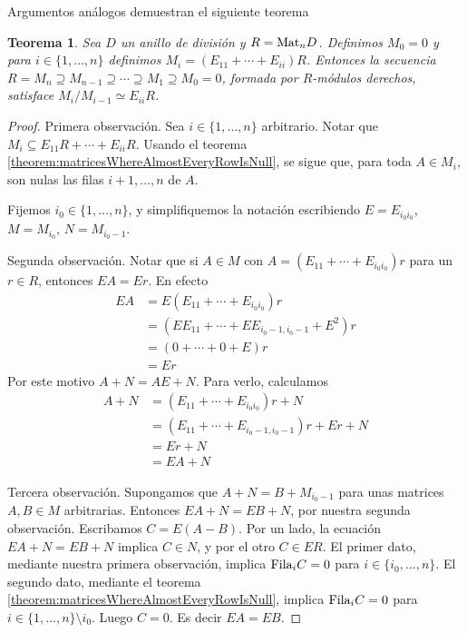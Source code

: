\documentclass{report}
\newcommand{\Mat}{\textnormal{Mat}}
\newcommand{\Fila}{\textnormal{Fila}}
\newtheorem{theorem}{Teorema}
\begin{document}
  Argumentos análogos demuestran el siguiente teorema
  \begin{theorem}\label{theorem:compositionSeriesOfRightModulesForMatrixRing}
    Sea \(D\) un anillo de división y \(R = \Mat_n D\).
    Definimos \(M_0 = 0\) y para \(i \in \{1, \dots, n\}\) definimos \(M_i = (E_{1 1} + \cdots + E_{i i}) R\).
    Entonces la secuencia \(R = M_n \supseteq M_{n - 1} \supseteq \cdots \supseteq M_1 \supseteq M_0 = 0\), formada por \(R\)-módulos derechos, satisface \(M_i / M_{i - 1} \simeq E_{i i} R\).
  \end{theorem}
  \begin{proof}
    Primera observación.
    Sea \(i \in \{1, \dots, n\}\) arbitrario.
    Notar que \(M_i \subseteq E_{1 1} R + \cdots + E_{i i} R\).
    Usando el teorema \ref{theorem:matricesWhereAlmostEveryRowIsNull}, se sigue que, para toda \(A \in M_i\), son nulas las filas \(i + 1, \dots, n\) de \(A\).

    Fijemos \(i_0 \in \{1, \dots, n\}\), y simplifiquemos la notación escribiendo \(E = E_{i_0 i_0}\), \(M = M_{i_0}\), \(N = M_{i_0 - 1}\).

    Segunda observación.
    Notar que si \(A \in M\) con \(A = (E_{1 1} + \cdots + E_{i_0 i_0}) r\) para un \(r \in R\), entonces \(E A = E r\).
    En efecto
    \begin{align}
      E A
      &=
      E (E_{1 1} + \cdots + E_{i_0 i_0}) r
      \\
      &=
      (E E_{1 1} + \cdots + E E_{i_0 - 1, i_0 - 1} + E^2) r
      \\
      &=
      (0 + \cdots + 0 + E) r
      \\
      &=
      E r
    \end{align}
    Por este motivo \(A + N = A E + N\).
    Para verlo, calculamos
    \begin{align}
      A + N
      &=
      (E_{1 1} + \cdots + E_{i_0 i_0}) r + N
      \\
      &=
      (E_{1 1} + \cdots + E_{i_0 - 1, i_0 - 1}) r + E r + N
      \\
      &=
      E r + N
      \\
      &=
      E A + N
    \end{align}

    Tercera observación.
    Supongamos que \(A + N = B + M_{i_0 -1}\) para unas matrices \(A, B \in M\) arbitrarias.
    Entonces \(E A + N = E B + N\), por nuestra segunda observación.
    Escribamos \(C = E (A - B)\).
    Por un lado, la ecuación \(E A + N = E B + N\) implica \(C \in N\), y por el otro \(C \in E R\).
    El primer dato, mediante nuestra primera observación, implica \(\Fila_i C = 0\) para \(i \in \{i_0, \dots, n\}\).
    El segundo dato, mediante el teorema \ref{theorem:matricesWhereAlmostEveryRowIsNull}, implica \(\Fila_i C = 0\) para \(i \in \{1, \dots, n\} \setminus i_0\).
    Luego \(C = 0\).
    Es decir \(E A = E B\).


\end{proof}
\end{document}
